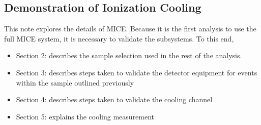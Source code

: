 \subsection{Demonstration of Ionization Cooling}
This note explores the details of MICE. Because it is the first analysis to use the
full MICE system, it is necessary to validate the subsystems. To this end,
\begin{itemize}
\item{Section 2:} describes the sample selection used in the rest of the analysis.
\item{Section 3:} describes steps taken to validate the detector equipment for
events within the sample outlined previously
\item{Section 4:} describes steps taken to validate the cooling channel
\item{Section 5:} explains the cooling measurement
\end{itemize}